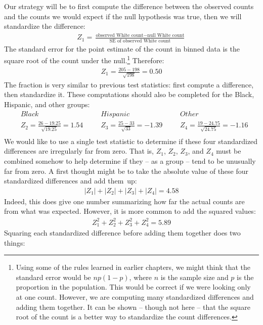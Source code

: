Our strategy will be to first compute the difference between the observed counts and the counts we would expect if the null hypothesis was true, then we will standardize the difference:
\begin{align*}
Z_{1} = \frac{\text{observed White count} - \text{null White count}}
				{\text{SE of observed White count}}
\end{align*}
The standard error for the point estimate of the count in binned data is the square root of the count under the null.\footnote{Using some of the rules learned in earlier chapters, we might think that the standard error would be $np(1-p)$, where $n$ is the sample size and $p$ is the proportion in the population. This would be correct if we were looking only at one count. However, we are computing many standardized differences and adding them together. It can be shown -- though not here -- that the square root of the count is a better way to standardize the count differences.} Therefore:
\begin{align*}
Z_1 = \frac{205 - 198}{\sqrt{198}} = 0.50
\end{align*}
The fraction is very similar to previous test statistics: first compute a difference, then standardize it. These computations should also be completed for the Black, Hispanic, and other groups:
\begin{align*}
&Black && Hispanic	&&Other \\
& Z_2 = \frac{26-19.25}{\sqrt{19.25}}=1.54\ \ \ \ 
	&& Z_3 = \frac{25-33}{\sqrt{33}}=-1.39\ \ \ \ 
	&& Z_4 = \frac{19-24.75}{\sqrt{24.75}}=-1.16 \\
\end{align*}
We would like to use a single test statistic to determine if these four standardized differences are irregularly far from zero. That is, $Z_1$, $Z_2$, $Z_3$, and $Z_4$ must be combined somehow to help determine if they -- as a group -- tend to be unusually far from zero. A first thought might be to take the absolute value of these four standardized differences and add them~up:
\begin{align*}
|Z_1| + |Z_2| + |Z_3| + |Z_4| = 4.58
\end{align*}
Indeed, this does give one number summarizing how far the actual counts are from what was expected. However, it is more common to add the squared values:
\begin{align*}
Z_1^2 + Z_2^2 + Z_3^2 + Z_4^2 = 5.89
\end{align*}
Squaring each standardized difference before adding them together does two things:
